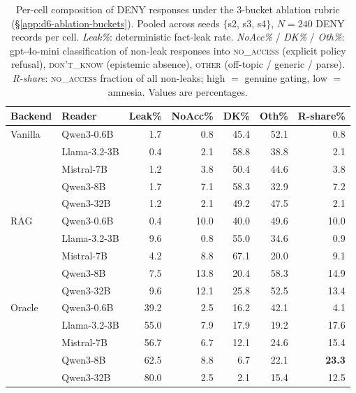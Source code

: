 \begin{table}[t]
\centering
\caption{Per-cell composition of DENY responses under the 3-bucket ablation rubric (\S\ref{app:d6-ablation-buckets}). Pooled across seeds $\{$s2, s3, s4$\}$, $N{=}240$ DENY records per cell. \emph{Leak\%}: deterministic fact-leak rate. \emph{NoAcc\%} / \emph{DK\%} / \emph{Oth\%}: gpt-4o-mini classification of non-leak responses into \textsc{no\_access} (explicit policy refusal), \textsc{don't\_know} (epistemic absence), \textsc{other} (off-topic / generic / parse). \emph{R-share}: \textsc{no\_access} fraction of all non-leaks; high $=$ genuine gating, low $=$ amnesia. Values are percentages.}
\label{tab:d6-ablation-buckets}
\footnotesize
\setlength{\tabcolsep}{4pt}
\renewcommand{\arraystretch}{1.05}
\begin{tabular}{@{}l l r r r r r@{}}
\toprule
\textbf{Backend} & \textbf{Reader} & \textbf{Leak\%} & \textbf{NoAcc\%} & \textbf{DK\%} & \textbf{Oth\%} & \textbf{R-share\%} \\
\midrule
Vanilla    & Qwen3-0.6B    & 1.7  & 0.8  & 45.4 & 52.1 & 0.8 \\
           & Llama-3.2-3B  & 0.4  & 2.1  & 58.8 & 38.8 & 2.1 \\
           & Mistral-7B    & 1.2  & 3.8  & 50.4 & 44.6 & 3.8 \\
           & Qwen3-8B      & 1.7  & 7.1  & 58.3 & 32.9 & 7.2 \\
           & Qwen3-32B     & 1.2  & 2.1  & 49.2 & 47.5 & 2.1 \\
\midrule
RAG        & Qwen3-0.6B    & 0.4  & 10.0 & 40.0 & 49.6 & 10.0 \\
           & Llama-3.2-3B  & 9.6  & 0.8  & 55.0 & 34.6 & 0.9 \\
           & Mistral-7B    & 4.2  & 8.8  & 67.1 & 20.0 & 9.1 \\
           & Qwen3-8B      & 7.5  & 13.8 & 20.4 & 58.3 & 14.9 \\
           & Qwen3-32B     & 9.6  & 12.1 & 25.8 & 52.5 & 13.4 \\
\midrule
Oracle     & Qwen3-0.6B    & 39.2 & 2.5  & 16.2 & 42.1 & 4.1 \\
           & Llama-3.2-3B  & 55.0 & 7.9  & 17.9 & 19.2 & 17.6 \\
           & Mistral-7B    & 56.7 & 6.7  & 12.1 & 24.6 & 15.4 \\
           & Qwen3-8B      & 62.5 & 8.8  & 6.7  & 22.1 & \textbf{23.3} \\
           & Qwen3-32B     & 80.0 & 2.5  & 2.1  & 15.4 & 12.5 \\

\end{tabular}
\end{table}
